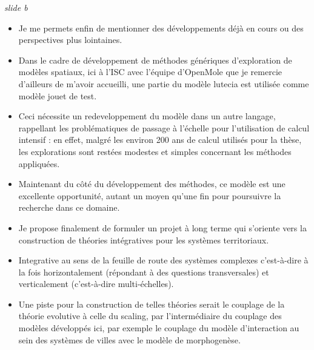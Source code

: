 \documentclass[12pt]{article}
\begin{document}
\newpage

\textit{slide b}

\begin{itemize}
	\item Je me permets enfin de mentionner des développements déjà en cours ou des perspectives plus lointaines.
	\item Dans le cadre de développement de méthodes génériques d'exploration de modèles spatiaux, ici à l'ISC avec l'équipe d'OpenMole que je remercie d'ailleurs de m'avoir accueilli, une partie du modèle lutecia est utilisée comme modèle jouet de test. 
	\item Ceci nécessite un redeveloppement du modèle dans un autre langage, rappellant les problématiques de passage à l'échelle pour l'utilisation de calcul intensif : en effet, malgré les environ 200 ans de calcul utilisés pour la thèse, les explorations sont restées modestes et simples concernant les méthodes appliquées.
	\item Maintenant du côté du développement des méthodes, ce modèle est une excellente opportunité, autant un moyen qu'une fin pour poursuivre la recherche dans ce domaine.
	\item Je propose finalement de formuler un projet à long terme qui s'oriente vers la construction de théories intégratives pour les systèmes territoriaux.
	\item Integrative au sens de la feuille de route des systèmes complexes c'est-à-dire à la fois horizontalement (répondant à des questions transversales) et verticalement (c'est-à-dire multi-échelles).
	\item Une piste pour la construction de telles théories serait le couplage de la théorie evolutive à celle du scaling, par l'intermédiaire du couplage des modèles développés ici, par exemple le couplage du modèle d'interaction au sein des systèmes de villes avec le modèle de morphogenèse.
\end{itemize}
\end{document}
